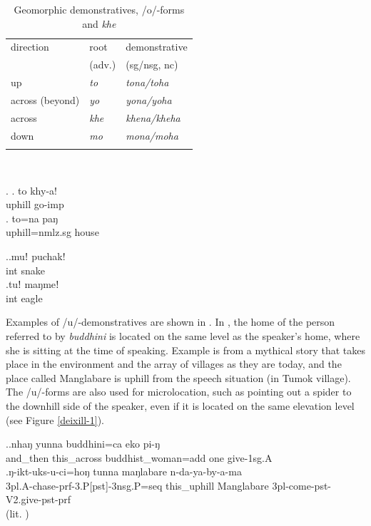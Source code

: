 \begin{table}[htp]
\begin{centering}
\begin{tabular}{lll}
\lsptoprule
 {\sc direction} & {\sc root } & {\sc demonstrative} \\
  &(adv.) & ({\sc sg/nsg, nc})\\
\midrule
{\sc up}&\emph{to} &\emph{tona/toha} \\
{\sc across (beyond)}&\emph{yo} &\emph{yona/yoha} \\
{\sc across }&\emph{khe}&\emph{khena/kheha} \\
{\sc down}&\emph{mo} &\emph{mona/moha} \\
\lspbottomrule
\end{tabular}\\
\caption{Geomorphic demonstratives,  /o/-forms and  \emph{khe} }\label{motoyo}
\end{centering}
\end{table}


\ex. \ag. to khy-a!\\
uphill go{\sc -imp}\\
\bg. to=na paŋ\\
uphill{\sc =nmlz.sg} house\\


\ex.\ag.muǃ puchak!\\
{\sc int} snake\\
\bg.tuǃ maŋmeǃ\\
{\sc int} eagle\\


Examples of /u/-demonstratives are shown in \Next.  In \Next[a], the home of the person referred to by \emph{buddhini} is located on the same level as the speaker's home, where she is sitting at the time of speaking. Example \Next[b] is from a mythical story that takes place in the environment and the array of villages as they are today, and the place called Manglabare is uphill from the speech situation (in Tumok village). The /u/-forms are also used for microlocation, such as pointing out a spider to the downhill side of the speaker, even if it is located on the same elevation level (see Figure  \ref{deixill-1}).

\ex.\ag.nhaŋ    yunna              buddhini=ca        eko pi-ŋ\\
and\_then this\_across buddhist\_woman{\sc =add} one give{\sc [pst]-1sg.A}\\
\bg.ŋ-ikt-uks-u-ci=hoŋ   tunna    maŋlabare n-da-ya-by-a-ma	\\
{\sc 3pl.A-}chase{\sc -prf-3.P[pst]-3nsg.P=seq} this\_uphill Manglabare {\sc 3pl-}come{\sc -pst-V2.give-pst-prf}\\
 (lit. ) 	



